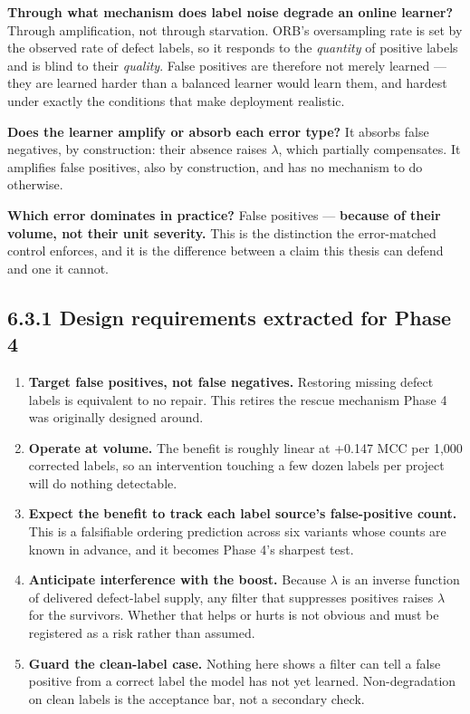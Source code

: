 \textbf{Through what mechanism does label noise degrade an online
learner?} Through amplification, not through starvation. ORB's
oversampling rate is set by the observed rate of defect labels, so it
responds to the \emph{quantity} of positive labels and is blind to their
\emph{quality}. False positives are therefore not merely learned ---
they are learned harder than a balanced learner would learn them, and
hardest under exactly the conditions that make deployment realistic.

\textbf{Does the learner amplify or absorb each error type?} It absorbs
false negatives, by construction: their absence raises \ensuremath{\lambda}, which
partially compensates. It amplifies false positives, also by
construction, and has no mechanism to do otherwise.

\textbf{Which error dominates in practice?} False positives ---
\textbf{because of their volume, not their unit severity.} This is the
distinction the error-matched control enforces, and it is the difference
between a claim this thesis can defend and one it cannot.

\subsection{6.3.1 Design requirements extracted for Phase
4}\label{design-requirements-extracted-for-phase-4}

\begin{enumerate}
\def\labelenumi{\arabic{enumi}.}
\tightlist
\item
  \textbf{Target false positives, not false negatives.} Restoring
  missing defect labels is equivalent to no repair. This retires the
  rescue mechanism Phase 4 was originally designed around.
\item
  \textbf{Operate at volume.} The benefit is roughly linear at +0.147
  MCC per 1,000 corrected labels, so an intervention touching a few
  dozen labels per project will do nothing detectable.
\item
  \textbf{Expect the benefit to track each label source's false-positive
  count.} This is a falsifiable ordering prediction across six variants
  whose counts are known in advance, and it becomes Phase 4's sharpest
  test.
\item
  \textbf{Anticipate interference with the boost.} Because \ensuremath{\lambda} is an
  inverse function of delivered defect-label supply, any filter that
  suppresses positives raises \ensuremath{\lambda} for the survivors. Whether that helps or
  hurts is not obvious and must be registered as a risk rather than
  assumed.
\item
  \textbf{Guard the clean-label case.} Nothing here shows a filter can
  tell a false positive from a correct label the model has not yet
  learned. Non-degradation on clean labels is the acceptance bar, not a
  secondary check.
\end{enumerate}

